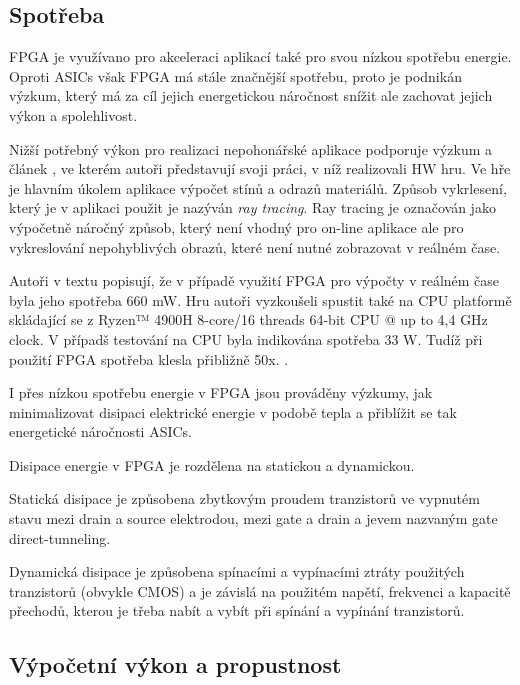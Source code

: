 \documentclass[a4paper, twoside, 11pt]{article}
\newcommand{\fbar}{\FloatBarrier}
\begin{document}
		\fbar
		\subsection{Spotřeba}
			FPGA je využívano pro akceleraci aplikací také pro svou nízkou spotřebu energie. Oproti ASICs však FPGA má stále značnější spotřebu, proto je podnikán výzkum, který má za cíl jejich energetickou náročnost snížit ale zachovat jejich výkon a spolehlivost.\par
			Nižší potřebný výkon pro realizaci nepohonářské aplikace podporuje výzkum a článek \cite{rovere-sphery-vs-shapes}, ve kterém autoři představují svoji práci, v níž realizovali HW hru. Ve hře je hlavním úkolem aplikace výpočet stínů a odrazů materiálů. Způsob vykrlesení, který je v aplikaci použit je nazýván \textit{ray tracing}. Ray tracing je označován jako výpočetně náročný způsob, který není vhodný pro on-line aplikace ale pro vykreslování nepohyblivých obrazů, které není nutné zobrazovat v reálném čase. \cite{wikipedia-ray-tracing}\par
			Autoři v textu popisují, že v případě využití FPGA pro výpočty v reálném čase byla jeho spotřeba 660 mW. Hru autoři vyzkoušeli spustit také na CPU platformě skládající se z Ryzen™️ 4900H 8-core/16 threads 64-bit CPU @ up to 4,4 GHz clock. V případš testování na CPU byla indikována spotřeba 33 W. Tudíž při použití FPGA spotřeba klesla přibližně 50x. \cite{rovere-sphery-vs-shapes}.\par
			I přes nízkou spotřebu energie v FPGA jsou prováděny výzkumy, jak minimalizovat disipaci elektrické energie v podobě tepla a přiblížit se tak energetické náročnosti ASICs.\par
			Disipace energie v FPGA je rozdělena na statickou a dynamickou.\par
			Statická disipace je způsobena zbytkovým proudem tranzistorů ve vypnutém stavu mezi drain a source elektrodou, mezi gate a drain a jevem nazvaným gate direct-tunneling. \cite{grover-reduction-of-power-consumption}\par
			Dynamická disipace je způsobena spínacími a vypínacími ztráty použitých tranzistorů (obvykle CMOS) a je závislá na použitém napětí, frekvenci a kapacitě přechodů, kterou je třeba nabít a vybít při spínání a vypínání tranzistorů. \cite{grover-reduction-of-power-consumption}
			\subsection{Výpočetní výkon a propustnost}
\end{document}
